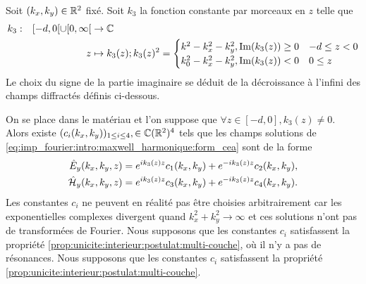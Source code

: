     \begin{defn}
        Soit \((k_x,k_y) \in \mathbb R^2\) fixé.
        Soit \(k_3\) la fonction constante par morceaux en \(z\) telle que
        \begin{equation*}
          \begin{aligned} &k_3: & [-d,0[\cup[0,\infty[ &\rightarrow \mathbb C \\ & & z & \mapsto 
            k_3(z); k_3(z)^2 =
            \begin{cases}
            k^2 - k_x^2 - k_y^2, \operatorname{Im}(k_3(z)) \ge 0 & -d \le z < 0
            \\
            k_0^2 - k_x^2 - k_y^2, \operatorname{Im}(k_3(z)) < 0 & 0 \le z
            \end{cases}
           \end{aligned}
        \end{equation*}
        Le choix du signe de la partie imaginaire se déduit de la décroissance à l'infini des champs diffractés définis ci-dessous.
    \end{defn}

    \begin{prop}
        On se place dans le matériau et l’on suppose que \(\forall z \in [-d,0], k_3(z) \not = 0\).
        Alors existe \((c_i(k_x,k_y))_{1\le i \le4}, \in \mathbb C(\mathbb R^2)^4\) tels que les champs solutions de \ref{eq:imp_fourier:intro:maxwell_harmonique:form_cea} sont de la forme
        \begin{align*}
            \hat{E}_y(k_x,k_y,z) & = e^{ik_3(z)z}c_1(k_x,k_y) + e^{-ik_3(z)z}c_2(k_x,k_y),
            \\
            \hat{\mathcal{H}}_y(k_x,k_y,z) & = e^{ik_3(z)z}c_3(k_x,k_y) + e^{-ik_3(z)z}c_4(k_x,k_y).
        \end{align*}
        Les constantes \(c_i\) ne peuvent en réalité pas être choisies arbitrairement car les exponentielles complexes divergent quand \(k_x^2 + k_y^2 \rightarrow \infty\) et ces solutions n'ont pas de transformées de Fourier. Nous supposons que les constantes \(c_i\) satisfassent la propriété \eqref{prop:unicite:interieur:postulat:multi-couche}, où il n'y a pas de résonances.
        Nous supposons que les constantes \(c_i\) satisfassent la propriété \eqref{prop:unicite:interieur:postulat:multi-couche}.

    \end{prop}


